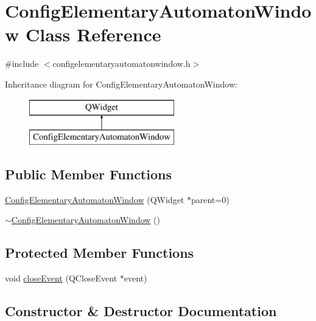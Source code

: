 \hypertarget{class_config_elementary_automaton_window}{}\section{Config\+Elementary\+Automaton\+Window Class Reference}
\label{class_config_elementary_automaton_window}


{\ttfamily \#include $<$configelementaryautomatonwindow.\+h$>$}

Inheritance diagram for Config\+Elementary\+Automaton\+Window\+:\begin{figure}[H]
\begin{center}
\leavevmode
\includegraphics[height=2.000000cm]{class_config_elementary_automaton_window}
\end{center}
\end{figure}
\subsection*{Public Member Functions}
\begin{DoxyCompactItemize}
\item 
\mbox{\hyperlink{class_config_elementary_automaton_window_aafbecf014aac8d083880e625eb369b55}{Config\+Elementary\+Automaton\+Window}} (Q\+Widget $\ast$parent=0)
\item 
\mbox{\hyperlink{class_config_elementary_automaton_window_ab24327bf4c61c62684d387a23c8c657f}{$\sim$\+Config\+Elementary\+Automaton\+Window}} ()
\end{DoxyCompactItemize}
\subsection*{Protected Member Functions}
\begin{DoxyCompactItemize}
\item 
void \mbox{\hyperlink{class_config_elementary_automaton_window_a47ec5922235e7fcb5fb51a81f1ebd0e7}{close\+Event}} (Q\+Close\+Event $\ast$event)
\end{DoxyCompactItemize}


\subsection{Constructor \& Destructor Documentation}
\mbox{\label{class_config_elementary_automaton_window_aafbecf014aac8d083880e625eb369b55}} 
